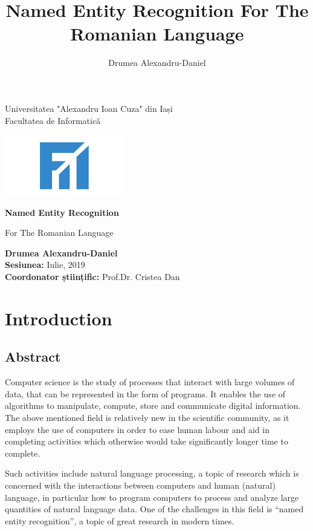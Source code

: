 \documentclass[12pt,a4paper]{article}
\author{Drumea Alexandru-Daniel}
\title{Named Entity Recognition For The Romanian Language}
\begin{document}
\begin{titlepage}
   \begin{center}
		Universitatea "Alexandru Ioan Cuza" din Iași\\
       Facultatea de Informatică\\
  	\vspace{1cm}

   	\includegraphics[scale=1]{fii}
  		       	
 	   \vspace{1cm}
		{\huge
       \textbf{Named Entity Recognition}
 
       \vspace{0.5cm}
        For The Romanian Language
 		}
       \vspace{3cm}
 
       \textbf{Drumea Alexandru-Daniel}\\
       \textbf{Sesiunea:} Iulie, 2019\\
		\textbf{Coordonator științific:} Prof.Dr. Cristea Dan
   \end{center}
\end{titlepage}

\tableofcontents
\newpage

\section{Introduction}

\subsection{Abstract}
	\qquad \quad Computer science is the study of processes that interact with large volumes of data, that can be represented in the form of programs. It enables the use of algorithms to manipulate, compute, store and communicate digital information. The above mentioned field is relatively new in the scientific community, as it employs the use of computers in order to ease human labour and aid in completing activities which otherwise would take significantly longer time to complete.
	
\qquad Such activities include natural language processing, a topic of research which is concerned with the interactions between computers and human (natural) language, in particular how to program computers to process and analyze large quantities of natural language data. One of the challenges in this field is “named entity recognition”, a topic of great research in modern times.
\end{document}
